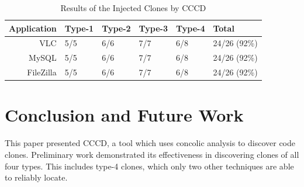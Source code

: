 \documentclass[conference]{IEEEtran}
\begin{document}
\begin{table}[thb!]
\begin{center}
\label{table:injectedclones}
\caption{Results of the Injected Clones by CCCD}
    \begin{tabular}{ r | l | l | l | l | l }
    \toprule
    Application & Type-1 & Type-2 & Type-3 & Type-4 & Total \\ \hline\hline
    	VLC  & 5/5  &6/6   & 7/7  & 6/8  & 24/26 (92\%)\\ \hline
	MySQL & 5/5  &6/6   & 7/7  & 6/8  & 24/26 (92\%)\\ \hline
	FileZilla & 5/5  &6/6   & 7/7  & 6/8  & 24/26 (92\%)\\ \bottomrule
    \end{tabular}
\end{center}
\vspace{2mm}
\end{table}



\section{Conclusion and Future Work}
\label{sec: conclusion}

This paper presented CCCD, a tool which uses concolic analysis to discover code clones. Preliminary work demonstrated its effectiveness in discovering clones of all four types. This includes type-4 clones, which only two other techniques are able to reliably locate. 







\end{document}
